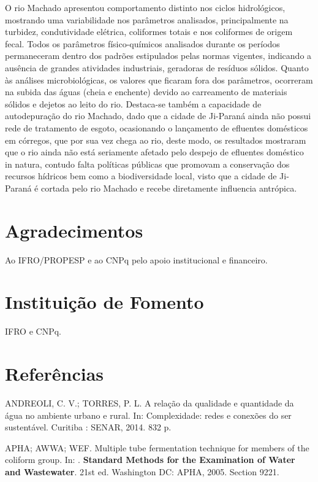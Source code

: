 \documentclass[article,12pt,onesidea,4paper,english,brazil]{abntex2}
\begin{document}
	O rio Machado apresentou comportamento distinto nos ciclos hidrológicos, mostrando uma variabilidade nos parâmetros analisados, principalmente na turbidez, condutividade elétrica, coliformes totais e nos coliformes de origem fecal. Todos os parâmetros físico-químicos analisados durante os períodos permaneceram dentro dos padrões estipulados pelas normas vigentes, indicando a ausência de grandes atividades industriais, geradoras de resíduos sólidos. Quanto às análises microbiológicas, os valores que ficaram fora dos parâmetros, ocorreram na subida das águas (cheia e enchente) devido ao carreamento de materiais sólidos e dejetos ao leito do rio. Destaca-se também a capacidade de autodepuração do rio Machado, dado que a cidade de Ji-Paraná ainda não possui rede de tratamento de esgoto, ocasionando o lançamento de efluentes domésticos em córregos, que por sua vez chega ao rio, deste modo, os resultados mostraram que o rio ainda não está seriamente afetado pelo despejo de efluentes doméstico in natura, contudo falta políticas públicas que promovam a conservação dos recursos hídricos bem como a biodiversidade local, visto que a cidade de Ji-Paraná é cortada pelo rio Machado e recebe diretamente influencia antrópica.
	
	\section*{Agradecimentos}
	
	Ao IFRO/PROPESP e ao CNPq pelo apoio institucional e financeiro.
	
	\section*{Instituição de Fomento}
	
	IFRO e CNPq.
	
	\section*{Referências}
	
ANDREOLI, C. V.; TORRES, P. L. A relação da qualidade e quantidade da água no ambiente urbano e rural. In: Complexidade: redes e conexões do ser sustentável. Curitiba : SENAR, 2014. 832 p.

APHA; AWWA; WEF. Multiple tube fermentation technique for members of the coliform group. In: . \textbf{Standard Methods for the Examination of Water and Wastewater}. 21st ed. Washington DC: APHA, 2005. Section 9221.
\end{document}
